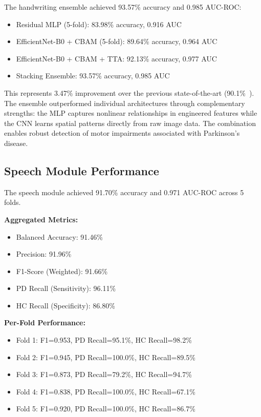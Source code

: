 \documentclass[10pt,conference,letterpaper]{IEEEtran}
\begin{document}
The handwriting ensemble achieved 93.57\% accuracy and 0.985 AUC-ROC:
\begin{itemize}
    \item Residual MLP (5-fold): 83.98\% accuracy, 0.916 AUC
    \item EfficientNet-B0 + CBAM (5-fold): 89.64\% accuracy, 0.964 AUC
    \item EfficientNet-B0 + CBAM + TTA: 92.13\% accuracy, 0.977 AUC
    \item Stacking Ensemble: 93.57\% accuracy, 0.985 AUC
\end{itemize}

This represents 3.47\% improvement over the previous state-of-the-art (90.1\%~\cite{ref6}). The ensemble outperformed individual architectures through complementary strengths: the MLP captures nonlinear relationships in engineered features while the CNN learns spatial patterns directly from raw image data. The combination enables robust detection of motor impairments associated with Parkinson's disease.

\subsection{Speech Module Performance}

The speech module achieved 91.70\% accuracy and 0.971 AUC-ROC across 5 folds.

\textbf{Aggregated Metrics:}
\begin{itemize}
    \item Balanced Accuracy: 91.46\%
    \item Precision: 91.96\%
    \item F1-Score (Weighted): 91.66\%
    \item PD Recall (Sensitivity): 96.11\%
    \item HC Recall (Specificity): 86.80\%
\end{itemize}

\textbf{Per-Fold Performance:}
\begin{itemize}
    \item Fold 1: F1=0.953, PD Recall=95.1\%, HC Recall=98.2\%
    \item Fold 2: F1=0.945, PD Recall=100.0\%, HC Recall=89.5\%
    \item Fold 3: F1=0.873, PD Recall=79.2\%, HC Recall=94.7\%
    \item Fold 4: F1=0.838, PD Recall=100.0\%, HC Recall=67.1\%
    \item Fold 5: F1=0.920, PD Recall=100.0\%, HC Recall=86.7\%
\end{itemize}
\end{document}

